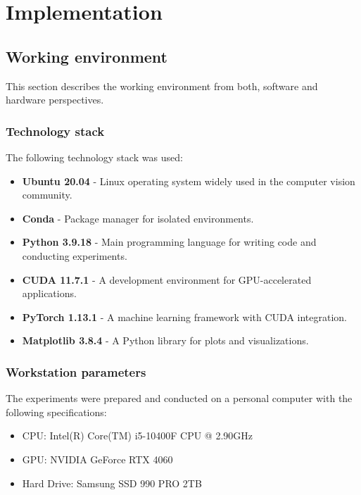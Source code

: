 
\chapter{Implementation} \label{chap:implementation}

\section{Working environment}

This section describes the working environment from both, software and hardware perspectives.

\subsection{Technology stack}

The following technology stack was used:
\begin{itemize}
  \item \textbf{Ubuntu 20.04} - Linux operating system widely used in the computer vision community. \cite{ubuntu-site}
  \item \textbf{Conda} - Package manager for isolated environments. \cite{conda-documentation}
  \item \textbf{Python 3.9.18} - Main programming language for writing code and conducting experiments. \cite{python}
  \item \textbf{CUDA 11.7.1} - A development environment for GPU-accelerated applications. \cite{cuda-toolkit}
  \item \textbf{PyTorch 1.13.1} - A machine learning framework with CUDA integration. \cite{pytorch}
  \item \textbf{Matplotlib 3.8.4} - A Python library for plots and visualizations. \cite{matplotlib}
\end{itemize}

\subsection{Workstation parameters}

The experiments were prepared and conducted on a personal computer with the following specifications:
\begin{itemize}
  \item CPU: Intel(R) Core(TM) i5-10400F CPU @ 2.90GHz \cite{intel-core-cpu}
  \item GPU: NVIDIA GeForce RTX 4060 \cite{nvidia-gpu}
  \item Hard Drive: Samsung SSD 990 PRO 2TB \cite{samsung-disc}
\end{itemize}

